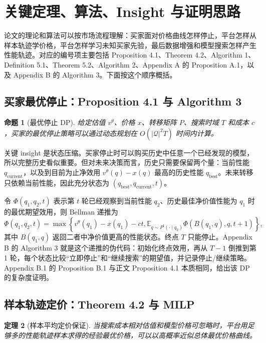 \documentclass[11pt,a4paper]{ctexart}
\newtheorem{theorem}{定理}[section]
\newtheorem{proposition}[theorem]{命题}
\theoremstyle{definition}
\newcommand{\E}{\mathbb{E}}
\begin{document}
\section{关键定理、算法、Insight 与证明思路}

论文的理论和算法可以按市场流程理解：买家面对价格曲线怎样停止，平台怎样从样本轨迹学价格，平台怎样学习未知买家先验，最后数据增强和模型搜索怎样产生性能轨迹。对应的编号项主要包括 Proposition 4.1、Theorem 4.2、Algorithm 1、Definition 5.1、Theorem 5.2、Algorithm 2、Appendix A 的 Proposition A.1，以及 Appendix B 的 Algorithm 3。下面按这个顺序概括。

\subsection{买家最优停止：Proposition 4.1 与 Algorithm 3}

\begin{proposition}[最优停止 DP]
给定估值 $v^\theta$、价格 $x$、转移矩阵 $P$、搜索时域 $T$ 和成本 $c$，买家的最优停止策略可以通过动态规划在 $O(|\mathcal Q|^2T)$ 时间内计算。
\end{proposition}

关键 insight 是状态压缩。买家停止时可以购买历史中任意一个已经发现的模型，所以完整历史看似重要。但对未来决策而言，历史只需要保留两个量：当前性能 $q_{\mathrm{current}}$，以及到目前为止净效用 $v^\theta(q)-x(q)$ 最高的历史性能 $q_{\mathrm{best}}$。未来转移只依赖当前性能，因此充分状态为 $(q_{\mathrm{best}},q_{\mathrm{current}},t)$。

令 $\Phi(q_1,q_2,t)$ 表示第 $t$ 轮已经观察到当前性能 $q_2$、历史最佳净价值性能为 $q_1$ 时的最优期望效用，则 Bellman 递推为
\[
\Phi(q_1,q_2,t)=\max\left\{v^\theta(q_1)-x(q_1)-ct,
\E_{q\sim P^t(\cdot\mid q_2)}\Phi(B(q_1,q),q,t+1)\right\},
\]
其中 $B(q_1,q)$ 返回二者中净价值更高的性能状态。终点 $T$ 只能停止。Appendix B 的 Algorithm 3 就是这个递推的伪代码：初始化终点效用，再从 $T-1$ 倒推到第 1 轮，每个状态比较“立即停止”和“继续搜索”的期望值，并记录停止/继续策略。Appendix B.1 的 Proposition B.1 与正文 Proposition 4.1 本质相同，给出该 DP 的复杂度证明。

\subsection{样本轨迹定价：Theorem 4.2 与 MILP}

\begin{theorem}[样本平均定价保证]
当搜索成本相对估值和模型价格可忽略时，平台用足够多的性能轨迹样本求得的经验最优价格，可以以高概率近似总体最优价格曲线。
\end{theorem}
\end{document}
